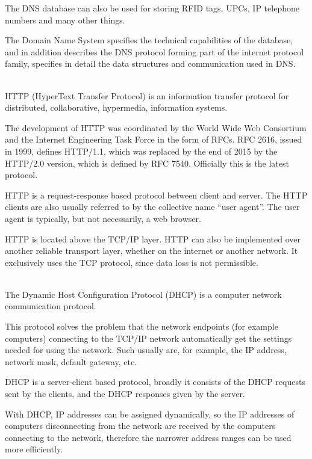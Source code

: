 \documentclass[margin=0px]{article}
\begin{document}
\begin{description}
        The DNS database can also be used for storing RFID tags, UPCs, IP telephone numbers and many other things.

        The Domain Name System specifies the technical capabilities of the database, and in addition describes the DNS protocol forming part of the internet protocol family, specifies in detail the data structures and communication used in DNS.

    \item[HTTP] \hfill \\
        HTTP (HyperText Transfer Protocol) is an information transfer protocol for distributed, collaborative, hypermedia, information systems.

        The development of HTTP was coordinated by the World Wide Web Consortium and the Internet Engineering Task Force in the form of RFCs. RFC 2616, issued in 1999, defines HTTP/1.1, which was replaced by the end of 2015 by the HTTP/2.0 version, which is defined by RFC 7540. Officially this is the latest protocol.

        HTTP is a request-response based protocol between client and server. The HTTP clients are also usually referred to by the collective name ``user agent''. The user agent is typically, but not necessarily, a web browser.

        HTTP is located above the TCP/IP layer. HTTP can also be implemented over another reliable transport layer, whether on the internet or another network. It exclusively uses the TCP protocol, since data loss is not permissible.
    \item[DHCP] \hfill \\
        The Dynamic Host Configuration Protocol (DHCP) is a computer network communication protocol.

        This protocol solves the problem that the network endpoints (for example computers) connecting to the TCP/IP network automatically get the settings needed for using the network. Such usually are, for example, the IP address, network mask, default gateway, etc.

        DHCP is a server-client based protocol, broadly it consists of the DHCP requests sent by the clients, and the DHCP responses given by the server.

        With DHCP, IP addresses can be assigned dynamically, so the IP addresses of computers disconnecting from the network are received by the computers connecting to the network, therefore the narrower address ranges can be used more efficiently.


\end{description}
\end{document}
